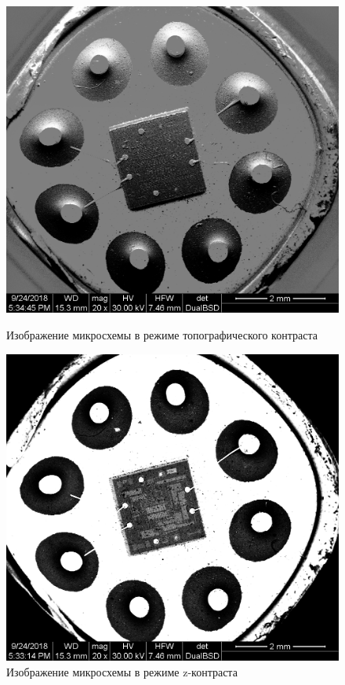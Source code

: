 \documentclass[a4paper, 12pt]{article}
\begin{document}
	\begin{figure}[!htb]
			\includegraphics[width=\linewidth]{topo_001.tif}
			\caption{Изображение микросхемы в режиме топографического контраста}
			\label{fig:topo_001}
		\endminipage\hfill
			\includegraphics[width=\linewidth]{z_001.tif}
			\caption{Изображение микросхемы в режиме z-контраста}
			\label{fig:z_001}
		\endminipage
	\end{figure}
\end{document}
